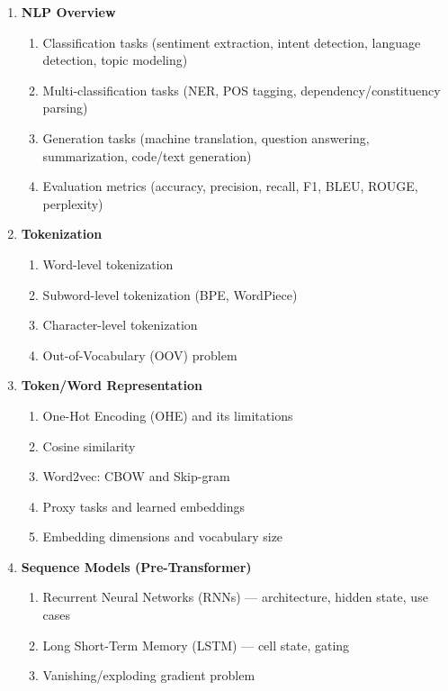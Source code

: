 \documentclass[11pt, a4paper]{article}
\begin{document}
\begin{enumerate}[label=\textbf{\arabic*.}, leftmargin=2em]
  \item \textbf{NLP Overview}
    \begin{enumerate}[label=\arabic{enumi}.\arabic*]
      \item Classification tasks (sentiment extraction, intent detection, language detection, topic modeling)
      \item Multi-classification tasks (NER, POS tagging, dependency/constituency parsing)
      \item Generation tasks (machine translation, question answering, summarization, code/text generation)
      \item Evaluation metrics (accuracy, precision, recall, F1, BLEU, ROUGE, perplexity)
    \end{enumerate}
  \item \textbf{Tokenization}
    \begin{enumerate}[label=\arabic{enumi}.\arabic*]
      \item Word-level tokenization
      \item Subword-level tokenization (BPE, WordPiece)
      \item Character-level tokenization
      \item Out-of-Vocabulary (OOV) problem
    \end{enumerate}
  \item \textbf{Token/Word Representation}
    \begin{enumerate}[label=\arabic{enumi}.\arabic*]
      \item One-Hot Encoding (OHE) and its limitations
      \item Cosine similarity
      \item Word2vec: CBOW and Skip-gram
      \item Proxy tasks and learned embeddings
      \item Embedding dimensions and vocabulary size
    \end{enumerate}
  \item \textbf{Sequence Models (Pre-Transformer)}
    \begin{enumerate}[label=\arabic{enumi}.\arabic*]
      \item Recurrent Neural Networks (RNNs) --- architecture, hidden state, use cases
      \item Long Short-Term Memory (LSTM) --- cell state, gating
      \item Vanishing/exploding gradient problem

\end{enumerate}
\end{enumerate}
\end{document}
